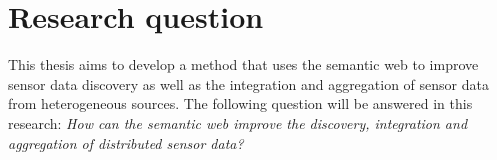 \section{Research question}
This thesis aims to develop a method that uses the semantic web to improve sensor data discovery as well as the integration and aggregation of sensor data from heterogeneous sources. The following question will be answered in this research:   
\textit{How can the semantic web improve the discovery, integration and aggregation of distributed sensor data?} 












































\iffalse

This document should include:

\begin{itemize} 
\item motivation / problem field /relevance

\item position in the academic and professional debate

\item problem statement, objectives, research questions

\item approach, theoretical framework, methodology

\item references

\item preliminary project set up and results

\end{itemize}


\section{Use Case}
Providing temperature data of all EU member states is part of the \ac{inspire} program. This data is useful for mapping the effects of extreme temperatures on citizen's health and the environment. \cite{UC:vanderHoeven} and \cite{UC:vanderHoeven2} are examples of studies which aim to identify urban heat islands in cities. These studies require temperature data combined with statistics, based on addresses. This research will be used as an example use case for the added value of the semantic sensor web. 
 

\fi